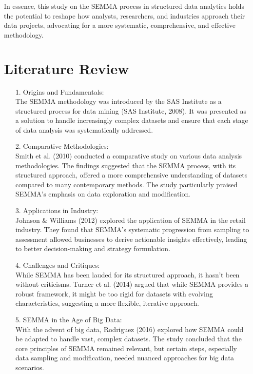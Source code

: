 \documentclass{article}
\begin{document}
In essence, this study on the SEMMA process in structured data analytics holds the potential to reshape how analysts, researchers, and industries approach their data projects, advocating for a more systematic, comprehensive, and effective methodology.

\section*{Literature Review}
\begin{itemize}
    \item[1.]Origins and Fundamentals: \\The SEMMA methodology was introduced by the SAS Institute as a structured process for data mining (SAS Institute, 2008). It was presented as a solution to handle increasingly complex datasets and ensure that each stage of data analysis was systematically addressed.
    \item[2.]Comparative Methodologies: \\Smith et al. (2010) conducted a comparative study on various data analysis methodologies. The findings suggested that the SEMMA process, with its structured approach, offered a more comprehensive understanding of datasets compared to many contemporary methods. The study particularly praised SEMMA's emphasis on data exploration and modification.
    \item[3.]Applications in Industry:\\ Johnson \& Williams (2012) explored the application of SEMMA in the retail industry. They found that SEMMA's systematic progression from sampling to assessment allowed businesses to derive actionable insights effectively, leading to better decision-making and strategy formulation.
    \item[4.]Challenges and Critiques: \\While SEMMA has been lauded for its structured approach, it hasn't been without criticisms. Turner et al. (2014) argued that while SEMMA provides a robust framework, it might be too rigid for datasets with evolving characteristics, suggesting a more flexible, iterative approach.
    \item[5.]SEMMA in the Age of Big Data:\\ With the advent of big data, Rodriguez (2016) explored how SEMMA could be adapted to handle vast, complex datasets. The study concluded that the core principles of SEMMA remained relevant, but certain steps, especially data sampling and modification, needed nuanced approaches for big data scenarios.

\end{itemize}
\end{document}
